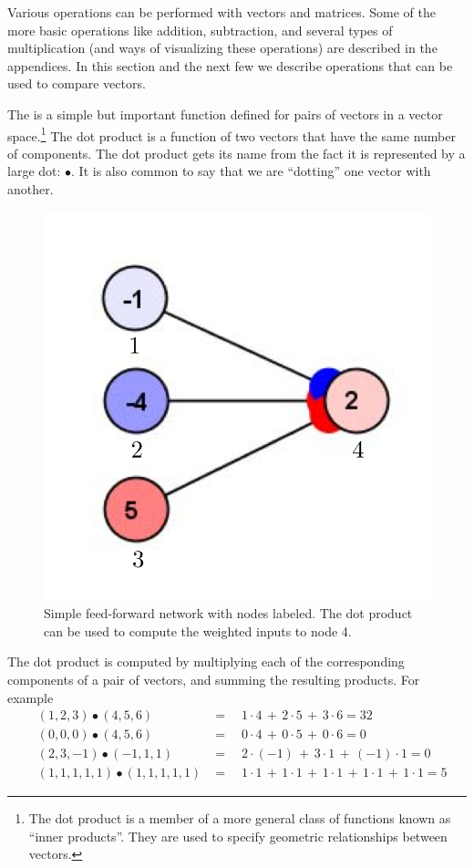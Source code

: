 Various operations can be performed with vectors and matrices. Some of the more basic operations like addition, subtraction, and several types of multiplication (and ways of visualizing these operations) are described in the appendices. In this section and the next few we describe operations that can be used to compare vectors.

   The  is a simple but important function defined for 
pairs of vectors in a vector space.\footnote{The dot product is a member 
of a more general class of functions known as ``inner products''. They are 
used to specify geometric relationships between vectors.}  The dot product is a function of two 
vectors that have the same 
number of components. The dot product gets its name from the fact it is represented by 
a large dot: $\bullet$. It is also common to say that we are ``dotting'' one 
vector with another.
\begin{figure}[h]
\centering
\includegraphics[scale=.7]{./images/Simple3Labelled.png}
\caption[Simbrain screenshot.]{Simple feed-forward network with nodes labeled. 
The dot product can be used to compute the weighted inputs to node 4.} 
\label{F:simplelabelled}
\end{figure}

   The dot product is computed by multiplying each of the corresponding 
components of a pair of vectors, and summing the resulting products. For 
example
\begin{eqnarray*}
&(1,2,3)  \bullet  (4,5,6)& = \quad 1 \cdot 4 \,+\, 2 \cdot 5 \,+\, 3 \cdot 6 
= 32 \\
&(0,0,0)  \bullet  (4,5,6)& = \quad 0 \cdot 4 \,+\, 0 \cdot 5 \,+\, 0 \cdot 6 
= 0  \\
&(2,3,-1) \bullet (-1,1,1)& = \quad 2 \cdot (-1) \,+\, 3 \cdot 1 \,+\, (-1) 
\cdot 1 = 0 \\
&(1,1,1,1,1) \bullet (1,1,1,1,1)& = \quad  
 1 \cdot 1 \,+\, 1 \cdot 1 \,+\,  1 \cdot 1 \,+\, 1 \cdot 1 \,+\, 1 \cdot 1 = 5
\end{eqnarray*}

